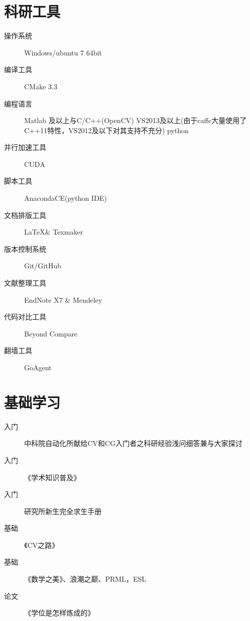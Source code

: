 \documentclass[a4paper，12pt]{article}
\begin{document}
\section{科研工具}

\begin{description}

\item[操作系统] Windows/ubuntu 7 64bit

\item[编译工具] CMake 3.3

\item[编程语言] Matlab 及以上与C/C++(OpenCV) VS2013及以上(由于caffe大量使用了C++11特性，VS2012及以下对其支持不充分) python

\item[并行加速工具] CUDA

\item[脚本工具] AnacondaCE(python IDE)

\item[文档排版工具] \LaTeX \& Texmaker

\item[版本控制系统] Git/GitHub

\item[文献整理工具] EndNote X7 \& Mendeley

\item[代码对比工具] Beyond Compare

\item[翻墙工具] GoAgent

\end{description}

\section{基础学习}

\begin{description}

\item[入门]中科院自动化所献给CV和CG入门者之科研经验浅问细答兼与大家探讨

\item[入门]《学术知识普及》

\item[入门] 研究所新生完全求生手册

\item[基础]《CV之路》 

\item[基础]《数学之美》、浪潮之巅、PRML，ESL

\item[论文]《学位是怎样炼成的》


\end{description}
\end{document}
